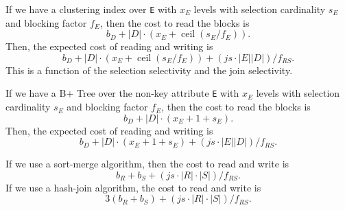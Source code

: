 \documentclass[a4paper, openany]{memoir}
\theoremstyle{definition}
\theoremstyle{plain}
\begin{document}
If we have a clustering index over \texttt{E} with $x_E$ levels with selection cardinality $s_E$ and blocking factor $f_E$, then the cost to read the blocks is
\[b_D + |D| \cdot (x_E + \operatorname{ceil}(s_E/f_E)).\]
Then, the expected cost of reading and writing is
\[b_D + |D| \cdot (x_E + \operatorname{ceil}(s_E/f_E)) + (\textit{js} \cdot |E| |D|)/f_{RS}.\]
This is a function of the selection selectivity and the join selectivity.

If we have a B+ Tree over the non-key attribute \texttt{E} with $x_E$ levels with selection cardinality $s_E$ and blocking factor $f_E$, then the cost to read the blocks is
\[b_D + |D| \cdot (x_E + 1 + s_E).\]
Then, the expected cost of reading and writing is
\[b_D + |D| \cdot (x_E + 1 + s_E) + (\textit{js} \cdot |E| |D|)/f_{RS}.\]

If we use a sort-merge algorithm, then the cost to read and write is
\[b_R + b_S + (\textit{js} \cdot |R| \cdot |S|)/f_{RS}.\]
If we use a hash-join algorithm, the cost to read and write is
\[3(b_R + b_S) + (\textit{js} \cdot |R| \cdot |S|)/f_{RS}.\]
\end{document}
